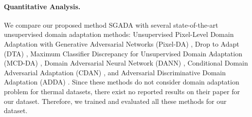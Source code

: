 \documentclass[final]{cvpr}
\begin{document}
\begin{table}[ht]
\renewcommand{\arraystretch}{1.3}
\caption{Per-class classification performance comparison.}
\label{table:results}
\vspace{3mm}
\centering
{}
\end{table}

\paragraph{Quantitative Analysis.} We compare our proposed method SGADA with several state-of-the-art unsupervised domain adaptation methods: Unsupervised Pixel-Level Domain Adaptation with Generative Adversarial Networks (Pixel-DA) \cite{pixelda}, Drop to Adapt (DTA) \cite{dta}, Maximum Classifier Discrepancy for Unsupervised Domain Adaptation (MCD-DA) \cite{mcdda}, Domain Adversarial Neural Network (DANN) \cite{dann}, Conditional Domain Adversarial Adaptation (CDAN) \cite{cdan}, and Adversarial Discriminative Domain Adaptation (ADDA) \cite{adda}. Since these methods do not consider domain adaptation problem for thermal datasets, there exist no reported results on their paper for our dataset. Therefore, we trained and evaluated all these methods for our dataset. 
\vspace{2mm}
\end{document}

